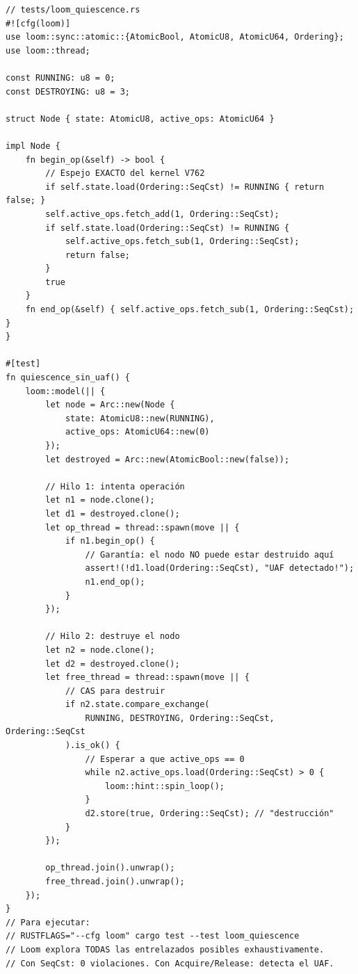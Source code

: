\begin{lstlisting}[style=ruststyle, caption={Test de Loom para el Protocolo de Quiescencia}, label=lst:loom_test]
// tests/loom_quiescence.rs
#![cfg(loom)]
use loom::sync::atomic::{AtomicBool, AtomicU8, AtomicU64, Ordering};
use loom::thread;

const RUNNING: u8 = 0;
const DESTROYING: u8 = 3;

struct Node { state: AtomicU8, active_ops: AtomicU64 }

impl Node {
    fn begin_op(&self) -> bool {
        // Espejo EXACTO del kernel V762
        if self.state.load(Ordering::SeqCst) != RUNNING { return false; }
        self.active_ops.fetch_add(1, Ordering::SeqCst);
        if self.state.load(Ordering::SeqCst) != RUNNING {
            self.active_ops.fetch_sub(1, Ordering::SeqCst);
            return false;
        }
        true
    }
    fn end_op(&self) { self.active_ops.fetch_sub(1, Ordering::SeqCst); }
}

#[test]
fn quiescence_sin_uaf() {
    loom::model(|| {
        let node = Arc::new(Node {
            state: AtomicU8::new(RUNNING),
            active_ops: AtomicU64::new(0)
        });
        let destroyed = Arc::new(AtomicBool::new(false));

        // Hilo 1: intenta operación
        let n1 = node.clone();
        let d1 = destroyed.clone();
        let op_thread = thread::spawn(move || {
            if n1.begin_op() {
                // Garantía: el nodo NO puede estar destruido aquí
                assert!(!d1.load(Ordering::SeqCst), "UAF detectado!");
                n1.end_op();
            }
        });

        // Hilo 2: destruye el nodo
        let n2 = node.clone();
        let d2 = destroyed.clone();
        let free_thread = thread::spawn(move || {
            // CAS para destruir
            if n2.state.compare_exchange(
                RUNNING, DESTROYING, Ordering::SeqCst, Ordering::SeqCst
            ).is_ok() {
                // Esperar a que active_ops == 0
                while n2.active_ops.load(Ordering::SeqCst) > 0 {
                    loom::hint::spin_loop();
                }
                d2.store(true, Ordering::SeqCst); // "destrucción"
            }
        });

        op_thread.join().unwrap();
        free_thread.join().unwrap();
    });
}
// Para ejecutar:
// RUSTFLAGS="--cfg loom" cargo test --test loom_quiescence
// Loom explora TODAS las entrelazados posibles exhaustivamente.
// Con SeqCst: 0 violaciones. Con Acquire/Release: detecta el UAF.
\end{lstlisting}

